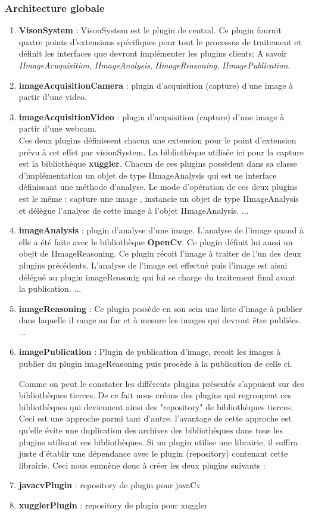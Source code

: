 \documentclass[a4paper , 12pt]{article}
\begin{document}
  \subsubsection{Architecture globale}
  \begin{enumerate}
  \item {\bf VisonSystem} : VisonSystem est le plugin de central. Ce plugin fournit quatre points d'extensions spécifiques pour tout le processus de traitement et définit les interfaces que devront implémenter les plugins clients; A savoir {\it IImageAcuquisition}, {\it IImageAnalysis}, {\it IImageReasoning}, {\it IImagePublication}.
  \item {\bf imageAcquisitionCamera} : plugin d'acquisition (capture) d'une image à partir d'une video. 
  \item {\bf imageAcquisitionVideo} :  plugin d'acquisition (capture) d'une image à partir d'une webcam. \\
    Ces deux plugins définissent chacun une extension pour le point d'extension prévu à cet effet par visionSystem. La bibliothèque utilisée ici pour la capture est la bibliothèque {\bf xuggler}. Chacun de ces plugins possèdent dans sa classe d'implémentation un objet de type IImageAnalysis qui est ue interface définissant une méthode d'analyse. Le mode d'opération de ces deux plugins est le même : capture une image , instancie un objet de type IImageAnalysis et délègue l'analyse de cette image à l'objet IImageAnalysis.
    ...
  \item {\bf imageAnalysis} : plugin d'analyse d'une image. L'analyse de l'image quand à elle a été faite avec le bibliothèque {\bf OpenCv}. Ce plugin définit lui aussi un obejt de IImageReasoning. Ce plugin récoit l'image à traiter de l'un des deux plugins précédents. L'analyse de l'image est effectué puis l'image est aisni délégué au plugin imageReasonig qui lui se charge du traitement final avant la publication. 
    ...
  \item {\bf imageReasoning} : Ce plugin possède en son sein une liste d'image à publier dans laquelle il range au fur et à mesure les images qui devront être publiées. ...
  \item {\bf imagePublication} : Plugin de publication d'image, recoit les images à publier du plugin imageReasoning puis procède à la publication de celle ci.
    
    Comme on peut le constater les différents plugins présentés s'appuient sur des bibliothèques tierces. De ce fait nous créons des plugins qui regroupent ces bibliothèques qui deviennent ainsi des "repository" de bibliothèques tierces. Ceci est une approche parmi tant d'autre. l'avantage de cette approche est qu'elle évite une duplication des archives des bibliothèques dans tous les plugins utilisant ces bibliothèques. Si un plugin utilise une librairie, il suffira juste d'établir une dépendance avec le plugin (repository) contenant cette librairie. Ceci nous emmène donc à créer les deux plugins suivants : 
  \item {\bf javacvPlugin} : repository de plugin pour javaCv  
  \item {\bf xugglerPlugin} : repository de plugin pour xuggler 

  \end{enumerate}
\end{document}
